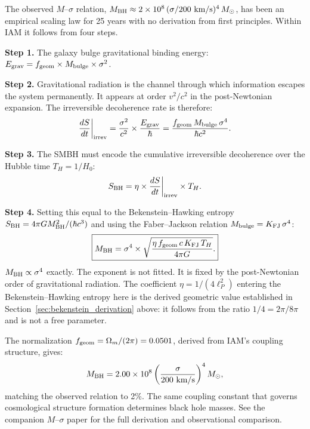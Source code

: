 \documentclass[12pt,a4paper]{article}
\begin{document}
The observed $M$--$\sigma$ relation, $M_{\rm BH} \approx 2 \times 10^8\,(\sigma/
200~\text{km/s})^4\,M_\odot$, has been an empirical scaling law for 25 years with
no derivation from first principles. Within IAM it follows from four steps.

\textbf{Step 1.} The galaxy bulge gravitational binding energy:
$E_{\rm grav} = f_{\rm geom} \times M_{\rm bulge} \times \sigma^2$.

\textbf{Step 2.} Gravitational radiation is the channel through which
information escapes the system permanently. It appears at order $v^2/c^2$ in
the post-Newtonian expansion. The irreversible decoherence rate is therefore:
\begin{equation}
\frac{dS}{dt}\bigg|_{\rm irrev} = \frac{\sigma^2}{c^2}
\times \frac{E_{\rm grav}}{\hbar}
= \frac{f_{\rm geom}\, M_{\rm bulge}\, \sigma^4}{\hbar c^2}.
\end{equation}

\textbf{Step 3.} The SMBH must encode the cumulative irreversible decoherence
over the Hubble time $T_H = 1/H_0$:
\begin{equation}
S_{\rm BH} = \eta \times \frac{dS}{dt}\bigg|_{\rm irrev} \times T_H.
\end{equation}

\textbf{Step 4.} Setting this equal to the Bekenstein--Hawking entropy
$S_{\rm BH} = 4\pi G M_{\rm BH}^2/(\hbar c^3)$ and using the Faber--Jackson
relation $M_{\rm bulge} = K_{\rm FJ}\,\sigma^4$:
\begin{equation}
\boxed{M_{\rm BH} = \sigma^4 \times \sqrt{\frac{\eta\, f_{\rm geom}\,
c\, K_{\rm FJ}\, T_H}{4\pi G}}.}
\end{equation}
$M_{\rm BH} \propto \sigma^4$ exactly. The exponent is not fitted. It is fixed
by the post-Newtonian order of gravitational radiation. The coefficient $\eta =
1/(4\ell_P^2)$ entering the Bekenstein--Hawking entropy here is the derived
geometric value established in Section~\ref{sec:bekenstein_derivation} above:
it follows from the ratio $1/4 = 2\pi/8\pi$ and is not a free parameter.

The normalization $f_{\rm geom} = \Omega_m/(2\pi) = 0.0501$, derived from IAM's
coupling structure, gives:
\begin{equation}
M_{\rm BH} = 2.00 \times 10^8 \left(\frac{\sigma}{200~\text{km/s}}\right)^4
M_\odot,
\end{equation}
matching the observed relation to 2\%. The same coupling constant that governs
cosmological structure formation determines black hole masses. See the companion
$M$--$\sigma$ paper for the full derivation and observational comparison.
\end{document}
